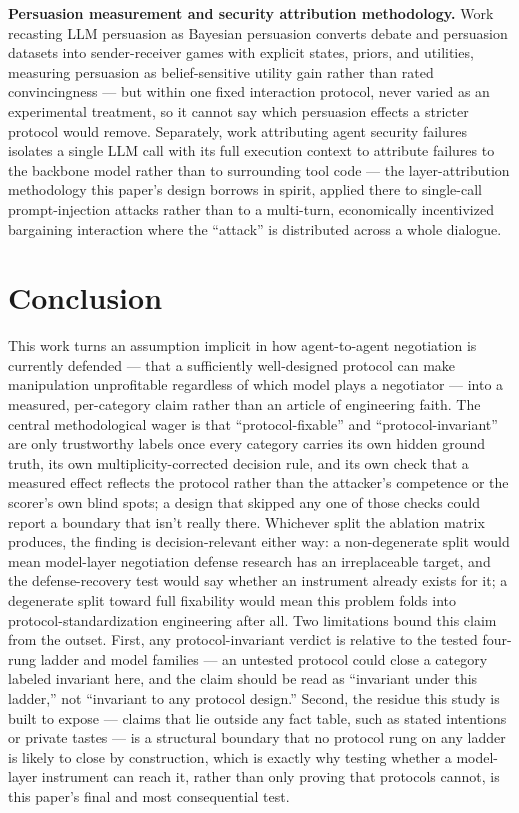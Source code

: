 \documentclass[11pt]{article}
\begin{document}
\textbf{Persuasion measurement and security attribution methodology.} Work recasting LLM persuasion as Bayesian persuasion \citep{StrategicPersuasion_aTCXvJKnkE} converts debate and persuasion datasets into sender-receiver games with explicit states, priors, and utilities, measuring persuasion as belief-sensitive utility gain rather than rated convincingness --- but within one fixed interaction protocol, never varied as an experimental treatment, so it cannot say which persuasion effects a stricter protocol would remove. Separately, work attributing agent security failures \citep{ThreatSnapshots_kga18ld70t} isolates a single LLM call with its full execution context to attribute failures to the backbone model rather than to surrounding tool code --- the layer-attribution methodology this paper's design borrows in spirit, applied there to single-call prompt-injection attacks rather than to a multi-turn, economically incentivized bargaining interaction where the ``attack'' is distributed across a whole dialogue.

\section{Conclusion}

This work turns an assumption implicit in how agent-to-agent negotiation is currently defended --- that a sufficiently well-designed protocol can make manipulation unprofitable regardless of which model plays a negotiator --- into a measured, per-category claim rather than an article of engineering faith. The central methodological wager is that ``protocol-fixable'' and ``protocol-invariant'' are only trustworthy labels once every category carries its own hidden ground truth, its own multiplicity-corrected decision rule, and its own check that a measured effect reflects the protocol rather than the attacker's competence or the scorer's own blind spots; a design that skipped any one of those checks could report a boundary that isn't really there. Whichever split the ablation matrix produces, the finding is decision-relevant either way: a non-degenerate split would mean model-layer negotiation defense research has an irreplaceable target, and the defense-recovery test would say whether an instrument already exists for it; a degenerate split toward full fixability would mean this problem folds into protocol-standardization engineering after all. Two limitations bound this claim from the outset. First, any protocol-invariant verdict is relative to the tested four-rung ladder and model families --- an untested protocol could close a category labeled invariant here, and the claim should be read as ``invariant under this ladder,'' not ``invariant to any protocol design.'' Second, the residue this study is built to expose --- claims that lie outside any fact table, such as stated intentions or private tastes --- is a structural boundary that no protocol rung on any ladder is likely to close by construction, which is exactly why testing whether a model-layer instrument can reach it, rather than only proving that protocols cannot, is this paper's final and most consequential test.
\end{document}
